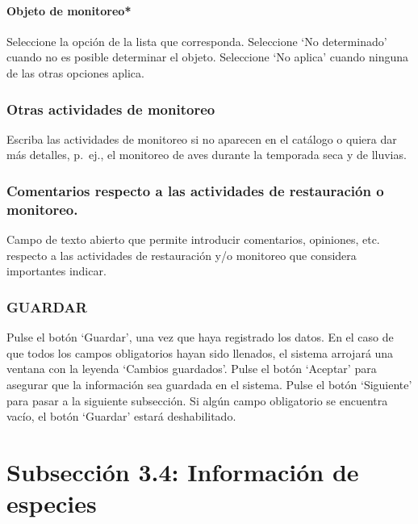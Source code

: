 \documentclass[
]{book}
\begin{document}
\hypertarget{objeto-de-monitoreo}{%
\subsubsection{Objeto de monitoreo*}\label{objeto-de-monitoreo}}

Seleccione la opción de la lista que corresponda.
Seleccione `No determinado' cuando no es posible determinar el objeto.
Seleccione `No aplica' cuando ninguna de las otras opciones aplica.

\hypertarget{otras-actividades-de-monitoreo}{%
\subsection{Otras actividades de monitoreo}\label{otras-actividades-de-monitoreo}}

Escriba las actividades de monitoreo si no aparecen en el catálogo o quiera dar más detalles, p.~ej., el monitoreo de aves durante la temporada seca y de lluvias.

\hypertarget{comentarios-respecto-a-las-actividades-de-restauraciuxf3n-o-monitoreo.}{%
\subsection{Comentarios respecto a las actividades de restauración o monitoreo.}\label{comentarios-respecto-a-las-actividades-de-restauraciuxf3n-o-monitoreo.}}

Campo de texto abierto que permite introducir comentarios, opiniones, etc. respecto a las actividades de restauración y/o monitoreo que considera importantes indicar.

\hypertarget{guardar-5}{%
\subsection{GUARDAR}\label{guardar-5}}

Pulse el botón `Guardar', una vez que haya registrado los datos.
En el caso de que todos los campos obligatorios hayan sido llenados, el sistema arrojará una ventana con la leyenda `Cambios guardados'. Pulse el botón `Aceptar' para asegurar que la información sea guardada en el sistema.
Pulse el botón `Siguiente' para pasar a la siguiente subsección.
Si algún campo obligatorio se encuentra vacío, el botón `Guardar' estará deshabilitado.

\hypertarget{subsecciuxf3n-3.4-informaciuxf3n-de-especies}{%
\chapter*{Subsección 3.4: Información de especies}\label{subsecciuxf3n-3.4-informaciuxf3n-de-especies}}
\end{document}

